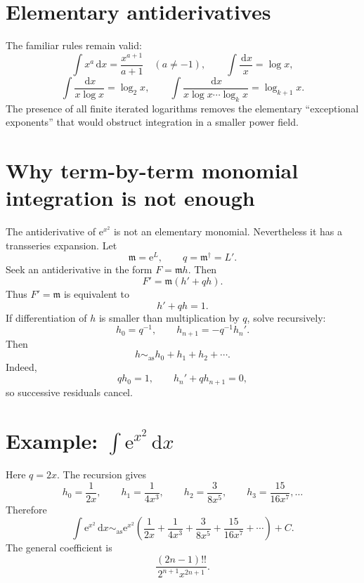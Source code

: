\documentclass[11pt,oneside]{book}
\theoremstyle{definition}
\theoremstyle{remark}
\newcommand{\m}{\mathfrak{m}}
\newcommand{\asympseries}{\sim_{\!\mathrm{as}}}
\newcommand{\e}{\mathrm{e}}
\newcommand{\dd}{\,\mathrm{d}}
\begin{document}
\section{Elementary antiderivatives}

The familiar rules remain valid:
\[
  \int x^a\dd x=\frac{x^{a+1}}{a+1}\quad(a\ne-1),
  \qquad
  \int\frac{\dd x}{x}=\log x,
\]
\[
  \int\frac{\dd x}{x\log x}=\log_2x,
  \qquad
  \int\frac{\dd x}{x\log x\cdots\log_kx}=\log_{k+1}x.
\]
The presence of all finite iterated logarithms removes the elementary
``exceptional exponents'' that would obstruct integration in a smaller power
field.

\section{Why term-by-term monomial integration is not enough}

The antiderivative of $\e^{x^2}$ is not an elementary monomial. Nevertheless it
has a transseries expansion. Let
\[
  \m=\e^L,
  \qquad q=\m^\dagger=L'.
\]
Seek an antiderivative in the form $F=\m h$. Then
\[
  F'=\m(h'+qh).
\]
Thus $F'=\m$ is equivalent to
\begin{equation}
  h'+qh=1.
  \label{eq:integration-h-equation}
\end{equation}
If differentiation of $h$ is smaller than multiplication by $q$, solve
recursively:
\begin{equation}
  h_0=q^{-1},
  \qquad
  h_{n+1}=-q^{-1}h_n'.
  \label{eq:integration-recursion}
\end{equation}
Then
\[
  h\asympseries h_0+h_1+h_2+\cdots.
\]
Indeed,
\[
  qh_0=1,
  \qquad
  h_n'+qh_{n+1}=0,
\]
so successive residuals cancel.

\section{Example: \texorpdfstring{$\int\e^{x^2}\dd x$}{the integral of exp(x squared)}}

Here $q=2x$. The recursion gives
\[
  h_0=\frac1{2x},
  \qquad
  h_1=\frac1{4x^3},
  \qquad
  h_2=\frac3{8x^5},
  \qquad
  h_3=\frac{15}{16x^7},\ldots
\]
Therefore
\begin{equation}
  \int\e^{x^2}\dd x
  \asympseries
  \e^{x^2}\left(
   \frac1{2x}+\frac1{4x^3}+\frac3{8x^5}
   +\frac{15}{16x^7}+\cdots
  \right)+C.
  \label{eq:exp-x2-antiderivative}
\end{equation}
The general coefficient is
\[
  \frac{(2n-1)!!}{2^{n+1}x^{2n+1}}.
\]
\end{document}
